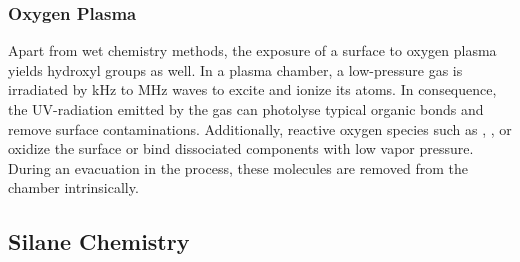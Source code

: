 \subsubsection{Oxygen Plasma}
Apart from wet chemistry methods, the exposure of a surface to oxygen plasma yields \gls{hydroxyl} groups as well. In a plasma chamber, a low-pressure gas is irradiated by \si{\kilo\hertz} to \si{\mega\hertz} waves to excite and ionize its atoms. In consequence, the UV-radiation emitted by the gas can photolyse typical organic bonds and remove surface contaminations. Additionally, reactive oxygen species such as , ,  or  oxidize the surface or bind dissociated components with low vapor pressure. During an evacuation in the process, these molecules are removed from the chamber intrinsically.\cite{lit:chem:plasma}  

\subsection{Silane Chemistry}

